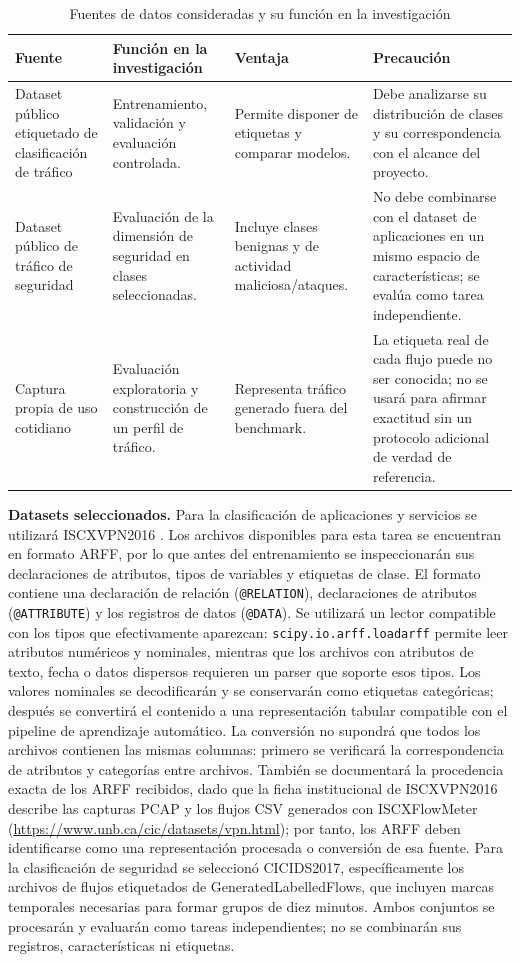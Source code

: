 \documentclass[conference]{IEEEtran}
\begin{document}
\begin{table}[!t]
\centering
\caption{Fuentes de datos consideradas y su función en la investigación}
\label{tab:fuentes}
\begin{tabular}{p{2.6cm}p{3.4cm}p{4.6cm}p{5.4cm}}
\toprule
\textbf{Fuente} & \textbf{Función en la investigación} & \textbf{Ventaja} & \textbf{Precaución} \\
\midrule
Dataset público etiquetado de clasificación de tráfico & Entrenamiento, validación y evaluación controlada. & Permite disponer de etiquetas y comparar modelos. & Debe analizarse su distribución de clases y su correspondencia con el alcance del proyecto. \\
Dataset público de tráfico de seguridad & Evaluación de la dimensión de seguridad en clases seleccionadas. & Incluye clases benignas y de actividad maliciosa/ataques. & No debe combinarse con el dataset de aplicaciones en un mismo espacio de características; se evalúa como tarea independiente. \\
Captura propia de uso cotidiano & Evaluación exploratoria y construcción de un perfil de tráfico. & Representa tráfico generado fuera del benchmark. & La etiqueta real de cada flujo puede no ser conocida; no se usará para afirmar exactitud sin un protocolo adicional de verdad de referencia. \\
\bottomrule
\end{tabular}
\end{table}

\textbf{Datasets seleccionados.} Para la clasificación de aplicaciones y servicios se utilizará ISCXVPN2016 \cite{drapergil2016}. Los archivos disponibles para esta tarea se encuentran en formato ARFF, por lo que antes del entrenamiento se inspeccionarán sus declaraciones de atributos, tipos de variables y etiquetas de clase. El formato contiene una declaración de relación (\texttt{@RELATION}), declaraciones de atributos (\texttt{@ATTRIBUTE}) y los registros de datos (\texttt{@DATA}). Se utilizará un lector compatible con los tipos que efectivamente aparezcan: \texttt{scipy.io.arff.loadarff} permite leer atributos numéricos y nominales, mientras que los archivos con atributos de texto, fecha o datos dispersos requieren un parser que soporte esos tipos. Los valores nominales se decodificarán y se conservarán como etiquetas categóricas; después se convertirá el contenido a una representación tabular compatible con el pipeline de aprendizaje automático. La conversión no supondrá que todos los archivos contienen las mismas columnas: primero se verificará la correspondencia de atributos y categorías entre archivos. También se documentará la procedencia exacta de los ARFF recibidos, dado que la ficha institucional de ISCXVPN2016 describe las capturas PCAP y los flujos CSV generados con ISCXFlowMeter (\url{https://www.unb.ca/cic/datasets/vpn.html}); por tanto, los ARFF deben identificarse como una representación procesada o conversión de esa fuente. Para la clasificación de seguridad se seleccionó CICIDS2017, específicamente los archivos de flujos etiquetados de GeneratedLabelledFlows, que incluyen marcas temporales necesarias para formar grupos de diez minutos. Ambos conjuntos se procesarán y evaluarán como tareas independientes; no se combinarán sus registros, características ni etiquetas.
\end{document}
